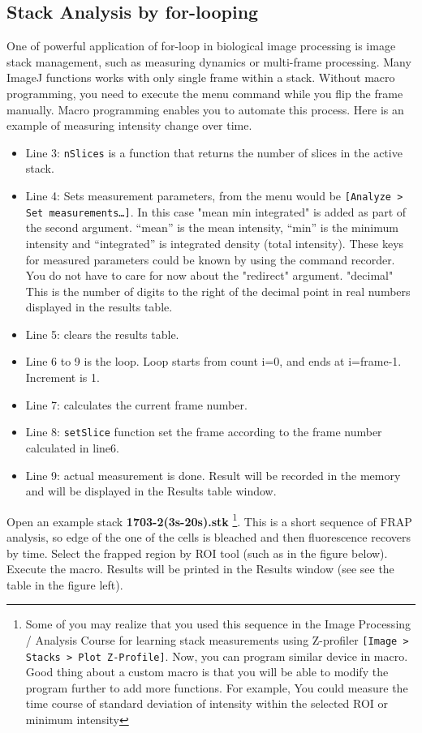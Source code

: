 \documentclass[11pt,a4paper,oneside]{report}
\newcommand{\ilcom}[1]{\texttt{\small#1}}
\begin{document}
\subsection{Stack Analysis by for-looping}
One of powerful application of for-loop in biological image processing is image stack management, 
such as measuring dynamics or multi-frame processing. 
Many ImageJ functions works with only single frame within a stack. 
Without macro programming, you need to execute the menu command while you flip the frame manually. 
Macro programming enables you to automate this process. 
Here is an example of measuring intensity change over time.
\begin{itemize}
\item Line 3: \ilcom{nSlices} is a function that returns the number of slices in the active stack. 

\item Line 4: Sets measurement parameters, from the menu would be \ilcom{[Analyze > Set measurements\ldots]}. In this case "mean min integrated" is added as part of the second argument. ``mean'' is the mean intensity, ``min'' is the minimum intensity and ``integrated'' is integrated density (total intensity). These keys for measured parameters could be known by using the command recorder. 
You do not have to care for now about the "redirect" argument. "decimal" This is the number of digits to 
the right of the decimal point in real numbers displayed in the results table. 

\item Line 5: clears the results table. 

\item Line 6 to 9 is the loop. Loop starts from count i=0, and ends at i=frame-1. Increment is 1.  

\item Line 7: calculates the current frame number. 

\item Line 8: \ilcom{setSlice} function set the frame according to the frame number calculated in line6. 

\item Line 9:  actual measurement is done. 
Result will be recorded in the memory and will be displayed in the Results table window. 
\end{itemize}

Open an example stack \textbf{1703-2(3s-20s).stk}
\footnote{Some of you may realize that you used this sequence 
in the Image Processing / Analysis Course for learning 
stack measurements using Z-profiler \ilcom{[Image > Stacks > Plot Z-Profile]}. Now, you can program similar 
device in macro. Good thing about a custom macro 
is that you will be able to modify the program further to add more functions.
For example, You could measure the time course of standard deviation of
intensity within the selected ROI or minimum intensity}. This is a short sequence of FRAP analysis,
so edge of the one of the cells is bleached and then fluorescence recovers by time. 
Select the frapped region by ROI tool (such as in the figure below). 
Execute the macro. Results will be printed in the Results window (see see the table in the figure left). 
\end{document}
